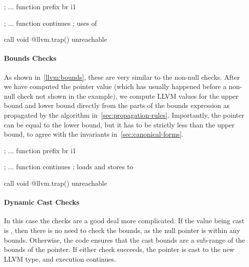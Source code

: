 \begin{code}[language=LLVM,float=ht,label=llvm:nonnull,
caption={Example Non-null check generated by the Checked C compiler.}]
  ; ... function prefix
  br i1 %

  ; ... function continues
  ; uses of %

  call void @llvm.trap()
  unreachable
\end{code}

\paragraph{Bounds Checks} As shown in~\autoref{llvm:bounds}, these are
very similar to the non-null checks. After we have computed the
pointer value (which has usually happened before a non-null check not
shown in the example), we compute LLVM values for the upper bound and
lower bound directly from the parts of the bounds expression as
propagated by the algorithm in~\autoref{sec:propagation-rules}.
Importantly, the pointer can be equal to the lower bound, but it has
to be strictly less than the upper bound, to agree with the invariants
in~\autoref{sec:canonical-forms}.

\begin{code}[language=LLVM,float=ht,label=llvm:bounds,
caption={Example Bounds check generated by the Checked C compiler.}]
  ; ... function prefix
  br i1 %

  ; ... function continues
  ; loads and stores to %

  call void @llvm.trap()
  unreachable
\end{code}

\paragraph{Dynamic Cast Checks} In this case the checks are a good
deal more complicated. If the value being cast is \NULL{}, then there
is no need to check the bounds, as the null pointer is within any
bounds. Otherwise, the code ensures that the cast bounds are a
sub-range of the bounds of the pointer. If either check succeeds, the
pointer is cast to the new LLVM type, and execution continues.

